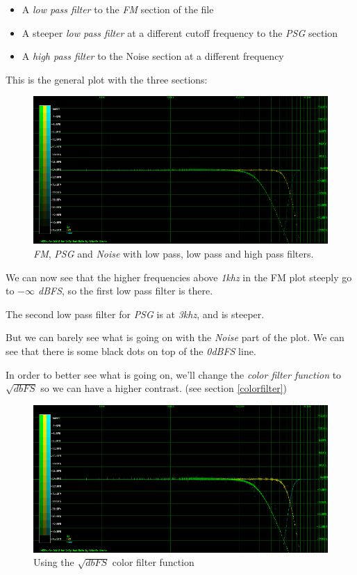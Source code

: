 \documentclass[10pt,a4paper]{report}
\begin{document}
\begin{itemize}
	\item A \textit{low pass filter} to the \textit{FM} section of the file
	\item A steeper \textit{low pass filter} at a different cutoff frequency to the \textit{PSG} section
	\item A \textit{high pass filter} to the Noise section at a different frequency
\end{itemize}

This is the general plot with the three sections:

\begin{figure}[H]
	\centering
	\includegraphics[width=1.0\linewidth]{plots/Plot4-1-All}
	\caption[All Plotted]{\textit{FM}, \textit{PSG} and \textit{Noise} with low pass, low pass and high pass filters.}
	\label{fig:plot4-1-all}
\end{figure}

We can now see that the higher frequencies above \textit{1khz} in the FM plot steeply go to \textit{$-\infty$ dBFS}, so the first low pass filter is there.

The second low pass filter for \textit{PSG} is at \textit{3khz}, and is steeper.

But we can barely see what is going on with the \textit{Noise} part of the plot. We can see that there is some black dots on top of the \textit{0dBFS} line.

In order to better see what is going on, we'll change the \textit{color filter function} to $\sqrt{dbFS}$ so we can have a higher contrast. (see section \ref{colorfilter})

\begin{figure}[H]
	\centering
	\includegraphics[width=1.0\linewidth]{plots/Plot4-2-All-sqrt}
	\caption[Using SQRT]{Using the $\sqrt{dbFS}$ color filter function}
	\label{fig:plot4-2-all-sqrt}
\end{figure}
\end{document}
